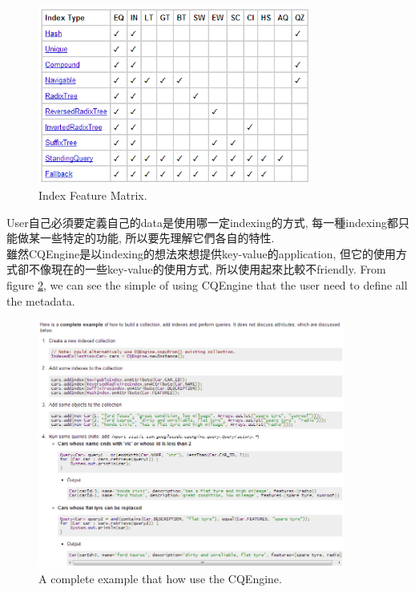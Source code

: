 \begin{figure}[h]
\centering
\includegraphics[width=0.8\textwidth]{./related-work/pic/CQEngine/CQEngine_index_2.png}
\caption{Index Feature Matrix.}
\label{fig:related-work:index_feature_matrix}
\end{figure}

User自己必須要定義自己的data是使用哪一定indexing的方式, 每一種indexing都只能做某一些特定的功能, 所以要先理解它們各自的特性.\\

雖然CQEngine是以indexing的想法來想提供key-value的application, 但它的使用方式卻不像現在的一些key-value的使用方式, 所以使用起來比較不friendly. From figure \ref{fig:related-work:example_useage}, we can see the simple of using CQEngine that the user need to define all the metadata.

\begin{figure}[h]
\centering
\includegraphics[width=0.9\textwidth]{./related-work/pic/CQEngine/CQEngine_index_3.png}
\caption{A complete example that how use the CQEngine.}
\label{fig:related-work:example_useage}
\end{figure}

